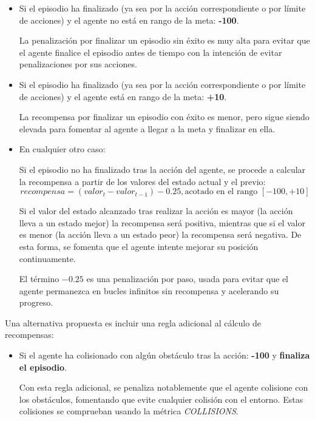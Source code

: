 \begin{itemize}

\item Si el episodio ha finalizado (ya sea por la acción correspondiente o por límite de acciones) y el agente no está en rango de la meta: \textbf{-100}.

La penalización por finalizar un episodio sin éxito es muy alta para evitar que el agente finalice el episodio antes de tiempo con la intención de evitar penalizaciones por sus acciones.

\item Si el episodio ha finalizado (ya sea por la acción correspondiente o por límite de acciones) y el agente está en rango de la meta: \textbf{+10}.

La recompensa por finalizar un episodio con éxito es menor, pero sigue siendo elevada para fomentar al agente a llegar a la meta y finalizar en ella.

\item En cualquier otro caso:

Si el episodio no ha finalizado tras la acción del agente, se procede a calcular la recompensa a partir de los valores del estado actual y el previo:
\[recompensa = (valor_t - valor_{t-1}) - 0.25, \text{acotado en el rango } [-100, +10]\]

Si el valor del estado alcanzado tras realizar la acción es mayor (la acción lleva a un estado mejor) la recompensa será positiva, mientras que si el valor es menor (la acción lleva a un estado peor) la recompensa será negativa. De esta forma, se fomenta que el agente intente mejorar su posición continuamente.

El término $-0.25$ es una penalización por paso, usada para evitar que el agente permanezca en bucles infinitos sin recompensa y acelerando su progreso.

\end{itemize} 

Una alternativa propuesta es incluir una regla adicional al cálculo de recompensas:
\begin{itemize}
	\item Si el agente ha colisionado con algún obstáculo tras la acción: \textbf{-100} y \textbf{finaliza el episodio}.
	
	Con esta regla adicional, se penaliza notablemente que el agente colisione con los obstáculos, fomentando que evite cualquier colisión con el entorno. Estas colisiones se comprueban usando la métrica \textit{COLLISIONS}.
\end{itemize}

